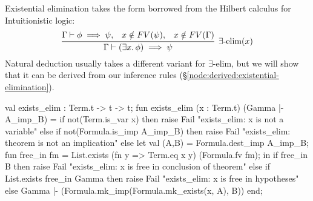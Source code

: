 \begin{node}\label{node:kernel:existential-elimination}
Existential elimination takes the form borrowed from the Hilbert
calculus for Intuitionistic logic:
\begin{equation*}
\vcenter{\infer[\exists\mbox{-elim}(x)]{\Gamma\vdash(\exists x\ldotp\phi)\implies\psi}{\Gamma\vdash\phi\implies\psi,&x\notin FV(\psi),&x\notin FV(\Gamma)}}
\end{equation*}
Natural deduction usually takes a different variant for
$\exists$-elim, but we will show that it can be derived from our
inference rules (\S\ref{node:derived:existential-elimination}).
\end{node}

\nwenddocs{}\plusendmoddef\nwstartdeflinemarkup{}\nwenddeflinemarkup
val exists_elim : Term.t -> t -> t;
\nwendcode{}\nwdocspar
\nwenddocs{}\plusendmoddef\nwstartdeflinemarkup{}\nwenddeflinemarkup
fun exists_elim (x : Term.t) (Gamma |- A_imp_B) =
  if not(Term.is_var x)
  then raise Fail "exists_elim: x is not a variable"
  else if not(Formula.is_imp A_imp_B)
  then raise Fail "exists_elim: theorem is not an implication"
  else let val (A,B) = Formula.dest_imp A_imp_B;
           fun free_in fm = List.exists (fn y => Term.eq x y) (Formula.fv fm);
       in if free_in B
          then raise Fail "exists_elim: x is free in conclusion of theorem"
          else if List.exists free_in Gamma
          then raise Fail "exists_elim: x is free in hypotheses"
          else Gamma |- (Formula.mk_imp(Formula.mk_exists(x, A), B))
       end;
\eatline
